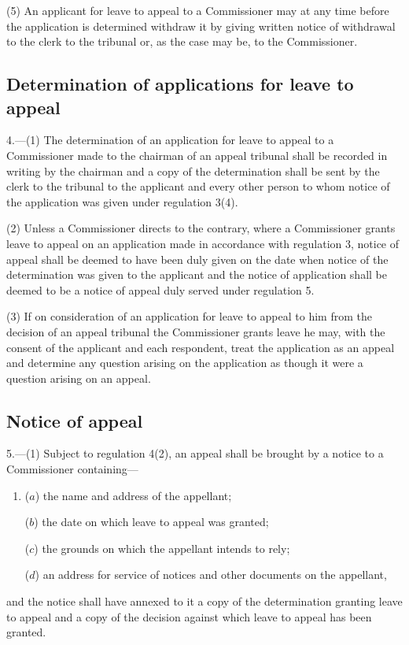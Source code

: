 \documentclass[a4paper]{article}
\begin{document}
(5) An applicant for leave to appeal to a Commissioner may at any time before the application is determined withdraw it by giving written notice of withdrawal to the clerk to the tribunal or, as the case may be, to the Commissioner.

\subsection[4. Determination of applications for leave to appeal]{Determination of applications for leave to appeal}

4.—(1) The determination of an application for leave to appeal to a Commissioner made to the chairman of an appeal tribunal shall be recorded in writing by the chairman and a copy of the determination shall be sent by the clerk to the tribunal to the applicant and every other person to whom notice of the application was given under regulation 3(4).

(2) Unless a Commissioner directs to the contrary, where a Commissioner grants leave to appeal on an application made in accordance with regulation 3, notice of appeal shall be deemed to have been duly given on the date when notice of the determination was given to the applicant and the notice of application shall be deemed to be a notice of appeal duly served under regulation 5.

(3) If on consideration of an application for leave to appeal to him from the decision of an appeal tribunal the Commissioner grants leave he may, with the consent of the applicant and each respondent, treat the application as an appeal and determine any question arising on the application as though it were a question arising on an appeal.

\subsection[5. Notice of appeal]{Notice of appeal}

5.—(1) Subject to regulation 4(2), an appeal shall be brought by a notice to a Commissioner containing—
\begin{enumerate}\item[]
($a$) the name and address of the appellant;

($b$) the date on which leave to appeal was granted;

($c$) the grounds on which the appellant intends to rely;

($d$) an address for service of notices and other documents on the appellant,
\end{enumerate}
and the notice shall have annexed to it a copy of the determination granting leave to appeal and a copy of the decision against which leave to appeal has been granted.
\end{document}
